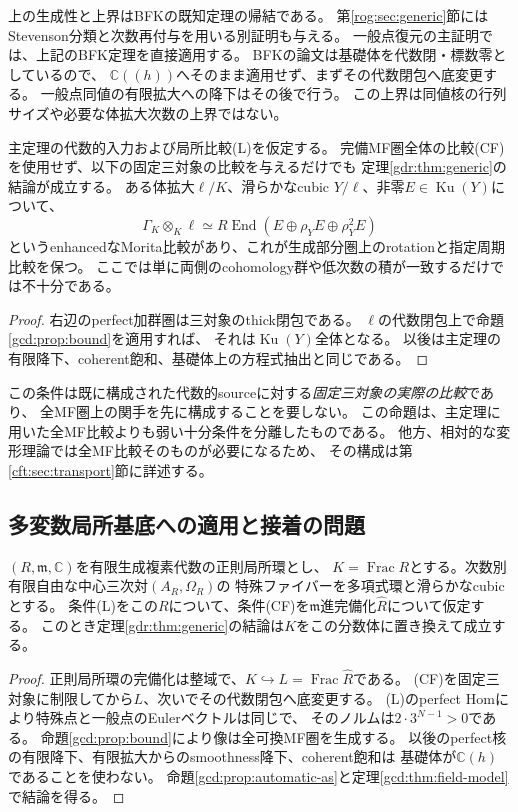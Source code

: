 上の生成性と上界はBFKの既知定理の帰結である。
第\ref{rog:sec:generic}節にはStevenson分類と次数再付与を用いる別証明も与える。
一般点復元の主証明では、上記のBFK定理を直接適用する。
BFKの論文は基礎体を代数閉・標数零としているので、
$\mathbb C((h))$へそのまま適用せず、まずその代数閉包へ底変更する。
一般点同値の有限拡大への降下はその後で行う。
この上界は同値核の行列サイズや必要な体拡大次数の上界ではない。

\begin{proposition}[固定三対象の比較による独立の十分条件]
\label{gcd:prop:three-object}
主定理の代数的入力および局所比較(L)を仮定する。
完備MF圏全体の比較(CF)を使用せず、以下の固定三対象の比較を与えるだけでも
定理\ref{gdr:thm:generic}の結論が成立する。
ある体拡大$\ell/K$、滑らかなcubic $Y/\ell$、非零$E\in\operatorname{Ku}(Y)$について、
\[
 \Gamma_K\otimes_K\ell\simeq
 R\operatorname{End}(E\oplus\rho_Y E\oplus\rho_Y^2 E)
\]
というenhancedなMorita比較があり、これが生成部分圏上のrotationと指定周期比較を保つ。
ここでは単に両側のcohomology群や低次数の積が一致するだけでは不十分である。
\end{proposition}
\begin{proof}
右辺のperfect加群圏は三対象のthick閉包である。
$\ell$の代数閉包上で命題\ref{gcd:prop:bound}を適用すれば、
それは$\operatorname{Ku}(Y)$全体となる。
以後は主定理の有限降下、coherent飽和、基礎体上の方程式抽出と同じである。
\end{proof}

この条件は既に構成された代数的sourceに対する\emph{固定三対象の実際の比較}であり、
全MF圏上の関手を先に構成することを要しない。
この命題は、主定理に用いた全MF比較よりも弱い十分条件を分離したものである。
他方、相対的な変形理論では全MF比較そのものが必要になるため、
その構成は第\ref{cft:sec:transport}節に詳述する。

\subsection{多変数局所基底への適用と接着の問題}

\begin{proposition}[任意次元の正則局所基底の一般点]
\label{gcd:prop:multibase}
$(R,\mathfrak m,\mathbb C)$を有限生成複素代数の正則局所環とし、
$K=\operatorname{Frac}R$とする。次数別有限自由な中心三次対$(A_R,\Omega_R)$の
特殊ファイバーを多項式環と滑らかなcubicとする。
条件(L)をこの$R$について、条件(CF)を$\mathfrak m$進完備化$\widehat R$について仮定する。
このとき定理\ref{gdr:thm:generic}の結論は$K$をこの分数体に置き換えて成立する。
\end{proposition}
\begin{proof}
正則局所環の完備化は整域で、$K\hookrightarrow L=\operatorname{Frac}\widehat R$である。
(CF)を固定三対象に制限してから$L$、次いでその代数閉包へ底変更する。
(L)のperfect Homにより特殊点と一般点のEulerベクトルは同じで、
そのノルムは$2\cdot3^{N-1}>0$である。
命題\ref{gcd:prop:bound}により像は全可換MF圏を生成する。
以後のperfect核の有限降下、有限拡大からのsmoothness降下、coherent飽和は
基礎体が$\mathbb C(h)$であることを使わない。
命題\ref{gcd:prop:automatic-as}と定理\ref{gcd:thm:field-model}で結論を得る。
\end{proof}

